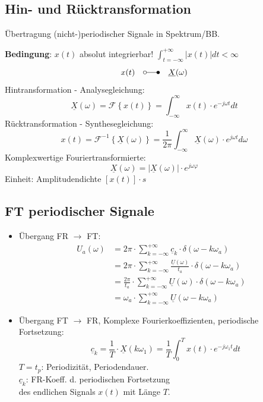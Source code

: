 \begin{multicols*}{2}
\subsection{Hin- und Rücktransformation}
{\small Übertragung (nicht-)periodischer Signale in Spektrum/BB.}\\
\begin{mdframed}[style=exercise]
	\small { \textbf{Bedingung}: $x(t)$ absolut integrierbar! $\int_{t=-\infty}^{+\infty}|x(t)|dt<\infty$ }
	\[
		x(t) \quad \laplace  \quad \underline{X}(\omega)
	\]
	Hintransformation - Analysegleichung:
	\[
		\underline{X}(\omega)=\mathcal{F}\left\{ x(t) \right\} = \int_{-\infty}^{\infty} x(t) \cdot e^{-j\omega t} dt
	\]
	Rücktransformation - Synthesegleichung:
	\[
		x(t) = \mathcal{F}^{-1}\left\{ \underline{X}(\omega) \right\} = \frac{1}{2\pi}\int_{-\infty}^{\infty} \underline{X}(\omega) \cdot e^{j\omega t} d\omega
	\]
	Komplexwertige Fouriertransformierte:
	\[
	\underline{X}(\omega) = |\underline{X}(\omega)|\cdot e^{j\omega\varphi}
	\]
	\footnotesize
	Einheit: Amplitudendichte $\left[ x(t) \right]\cdot s$
	\normalsize
	
\end{mdframed}

\subsection{FT periodischer Signale}
\begin{itemize}

	\item Übergang FR $\rightarrow$ FT:
\begin{align*}
	U_a(\omega) &= 2\pi \cdot \sum_{k=-\infty}^{+\infty} \underline{c}_k \cdot \delta(\omega-k\omega_a)\\
	& = 2\pi \cdot \sum_{k=-\infty}^{+\infty} \frac{\underline{U}(\omega)}{t_a} \cdot \delta(\omega-k\omega_a)\\
	&= \frac{2\pi}{t_a} \cdot \sum_{k=-\infty}^{+\infty} \underline{U}(\omega) \cdot \delta(\omega-k\omega_a) \\
	& =  \omega_a \cdot \sum_{k=-\infty}^{+\infty} \underline{U}(\omega-k\omega_a)
\end{align*}
	\item Übergang FT $\rightarrow$ FR, Komplexe Fourierkoeffizienten, periodische Fortsetzung:
	\[ \boxed{
		\quad \underline{c}_k =
		\frac{1}{T} \cdot \underline{X}(k\omega_1) } =
		\frac{1}{T}\int_0^T x(t) \cdot e^{-j\omega_1 t} dt
	\]
	\small{$T=t_p$: Periodizität, Periodendauer.}\\
	\small{ $\underline{c}_k$: FR-Koeff. d. periodischen Fortsetzung \\des endlichen Signals $x(t)$ mit Länge $T$.}\\
	

\end{itemize}
\end{multicols*}

